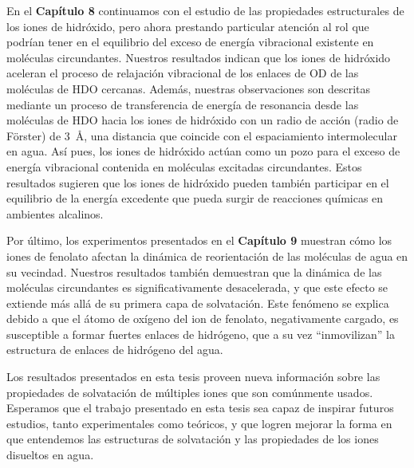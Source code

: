 En el \textbf{Cap\'itulo 8} continuamos con el estudio de las propiedades estructurales de los iones de hidr\'oxido, pero ahora prestando particular atenci\'on al rol que podr\'ian tener en el equilibrio del exceso de energ\'ia vibracional existente en mol\'eculas circundantes. Nuestros resultados indican que los iones de hidr\'oxido aceleran el proceso de relajaci\'on vibracional de los enlaces de OD de las mol\'eculas de HDO cercanas. Adem\'as, nuestras observaciones son descritas mediante un proceso de transferencia de energ\'ia de resonancia desde las mol\'eculas de HDO hacia los iones de hidr\'oxido con un radio de acci\'on (radio de Förster) de 3~\AA, una distancia que coincide con el espaciamiento intermolecular en agua. As\'i pues, los iones de hidr\'oxido act\'uan como un pozo para el exceso de energ\'ia vibracional contenida en mol\'eculas excitadas circundantes. Estos resultados sugieren que los iones de hidr\'oxido pueden tambi\'en participar en el equilibrio de la energ\'ia excedente que pueda surgir de reacciones qu\'imicas en ambientes alcalinos.


Por \'ultimo, los experimentos presentados en el \textbf{Cap\'itulo 9} muestran c\'omo los iones de fenolato afectan la din\'amica de reorientaci\'on de las mol\'eculas de agua en su vecindad. Nuestros resultados tambi\'en demuestran que la din\'amica de las mol\'eculas circundantes es significativamente desacelerada, y que este efecto se extiende m\'as all\'a de su primera capa de solvataci\'on. Este fen\'omeno se explica debido a que el \'atomo de ox\'igeno del ion de fenolato, negativamente cargado, es susceptible a formar fuertes enlaces de hidr\'ogeno, que a su vez ``inmovilizan'' la estructura de enlaces de hidr\'ogeno del agua.


Los resultados presentados en esta tesis proveen nueva informaci\'on sobre las propiedades de solvataci\'on de m\'ultiples iones que son com\'unmente usados. Esperamos que el trabajo presentado en esta tesis sea capaz de inspirar futuros estudios, tanto experimentales como te\'oricos, y que logren mejorar la forma en que entendemos las estructuras de solvataci\'on y las propiedades de los iones disueltos en agua.





